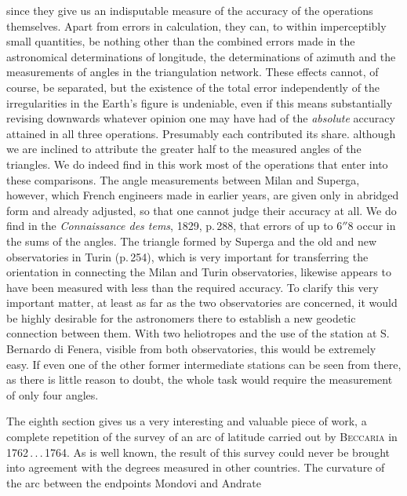 %
since they give us an indisputable measure of the accuracy of the operations themselves. Apart from errors in calculation, they can, to within imperceptibly small quantities, be nothing other than the combined errors made in the astronomical determinations of longitude, the determinations of azimuth and the measurements of angles in the triangulation network. These effects cannot, of course, be separated, but the existence of the total error independently of the irregularities in the Earth's figure is undeniable, even if this means substantially revising downwards whatever opinion one may have had of the \textit{absolute} accuracy attained in all three operations. Presumably each contributed its share. although we are inclined to attribute the greater half to the measured angles of the triangles. We do indeed find in this work most of the operations that enter into these comparisons. The angle measurements between Milan and Superga, however, which French engineers made in earlier years, are given only in abridged form and already adjusted, so that one cannot judge their accuracy at all. We do find in the \textit{Connaissance des tems}, 1829, p.\,288, that errors of up to \(6''8\) occur in the sums of the angles. The triangle formed by Superga and the old and new observatories in Turin (p.\,254), which is very important for transferring the orientation in connecting the Milan and Turin observatories, likewise appears to have been measured with less than the required accuracy. To clarify this very important matter, at least as far as the two observatories are concerned, it would be highly desirable for the astronomers there to establish a new geodetic connection between them. With two heliotropes and the use of the station at S.\,Bernardo di Fenera, visible from both observatories, this would be extremely easy. If even one of the other former intermediate stations can be seen from there, as there is little reason to doubt, the whole task would require the measurement of only four angles.

The eighth section gives us a very interesting and valuable piece of work, a complete repetition of the survey of an arc of latitude carried out by \textsc{Beccaria} in 1762\,.\,.\,.\,1764. As is well known, the result of this survey could never be brought into agreement with the degrees measured in other countries. The curvature of the arc between the endpoints Mondovi and Andrate

